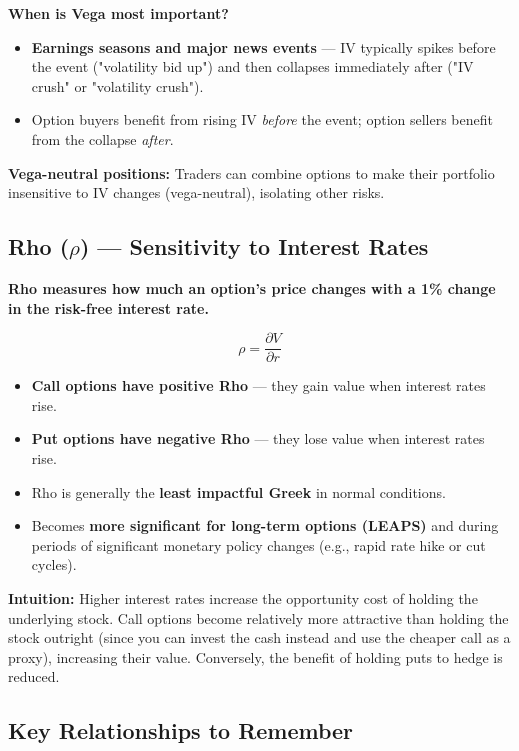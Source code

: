 \documentclass[12pt,openany]{book}
\begin{document}
\textbf{When is Vega most important?}
\begin{itemize}[leftmargin=*]
    \item \textbf{Earnings seasons and major news events} — IV typically spikes before the event ("volatility bid up") and then collapses immediately after ("IV crush" or "volatility crush").
    \item Option buyers benefit from rising IV \emph{before} the event; option sellers benefit from the collapse \emph{after}.
\end{itemize}

\textbf{Vega-neutral positions:} Traders can combine options to make their portfolio insensitive to IV changes (vega-neutral), isolating other risks.

\subsection{Rho (\texorpdfstring{\(\rho\)}{rho}) — Sensitivity to Interest Rates}

\textbf{Rho measures how much an option's price changes with a 1\% change in the risk-free interest rate.}

\[
\rho = \frac{\partial V}{\partial r}
\]

\begin{itemize}[leftmargin=*]
    \item \textbf{Call options have positive Rho} — they gain value when interest rates rise.
    \item \textbf{Put options have negative Rho} — they lose value when interest rates rise.
    \item Rho is generally the \textbf{least impactful Greek} in normal conditions.
    \item Becomes \textbf{more significant for long-term options (LEAPS)} and during periods of significant monetary policy changes (e.g., rapid rate hike or cut cycles).
\end{itemize}

\textbf{Intuition:} Higher interest rates increase the opportunity cost of holding the underlying stock. Call options become relatively more attractive than holding the stock outright (since you can invest the cash instead and use the cheaper call as a proxy), increasing their value. Conversely, the benefit of holding puts to hedge is reduced.

\subsection{Key Relationships to Remember}
\end{document}
